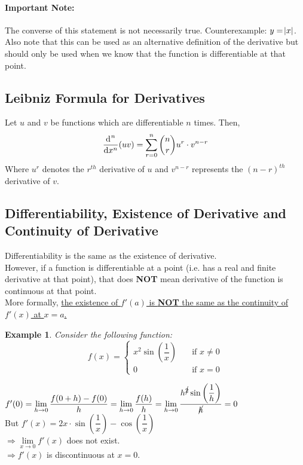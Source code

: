 \documentclass[14]{article}
\newtheorem*{ex}{Example}
\theoremstyle{definition}
\theoremstyle{case}
\begin{document}
\paragraph{Important Note:}The converse of this statement is not necessarily true. Counterexample: $y = \abs{x}$.
Also note that this can be used as an alternative definition of the derivative but should only be used when we know that the function is differentiable at that point.
\subsection{Leibniz Formula for Derivatives}
Let $u$ and $v$ be functions which are differentiable $n$ times. Then,\\
\[
\dfrac{\dif^{\;n}}{\dif x^n} (uv) = \sum\limits_{r=0}^{n} {n \choose r} u^r \cdot v^{n - r}
\]
Where $u^r$ denotes the $r^{th}$ derivative of $u$ and $v^{n-r}$ represents the $(n-r)^{th}$ derivative of $v$.
\subsection{Differentiability, Existence of Derivative and Continuity of Derivative}
Differentiability is the same as the existence of derivative.\\
However, if a function is differentiable at a point (i.e. has a real and finite derivative at that point), that does \textbf{NOT} mean derivative of the function is continuous at that point.\\
More formally, \underline{the existence of $f'(a)$ is \textbf{NOT} the same as the continuity of $f'(x)$ at $x = a$.}
\begin{ex}
Consider the following function:
\[
f(x) = \left\{
        \begin{array}{ll}
            x^2 \sin\left(\dfrac{1}{x}\right) & \quad \text{if } x \neq 0\\
            0 & \quad \text{if } x = 0 
        \end{array}
    \right.
\]
\end{ex}
$f'(0) = \lim\limits_{h \to 0} \dfrac{f(0+h) - f(0)}{h} = \lim\limits_{h \to 0} \dfrac{f(h)}{h} = \lim\limits_{h \to 0} \dfrac{h^{\cancel{2}} \sin\left(\dfrac{1}{h}\right)}{\cancel{h}} = 0$\\
But $f'(x) = 2x\cdot \sin\left(\dfrac{1}{x}\right) - \cos\left(\dfrac{1}{x}\right)\;$\\
$\Rightarrow \lim\limits_{x \to 0} f'(x)$ does not exist.\\
$\Rightarrow f'(x)$ is discontinuous at $x = 0$.
\pagebreak
\end{document}
